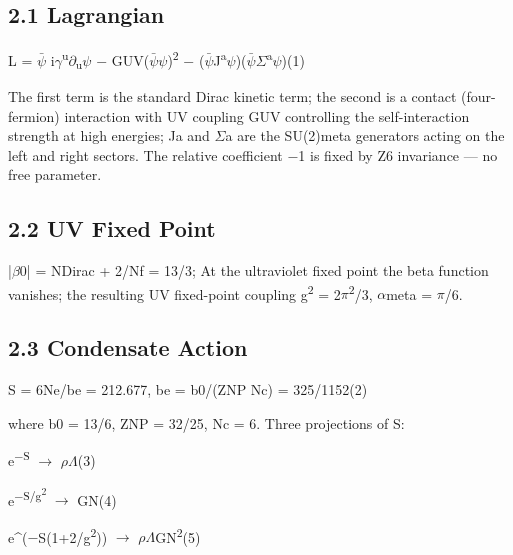 \documentclass[11pt,letterpaper]{article}
\begin{document}
\subsection*{2.1  Lagrangian}

\begingroup\centering L = $\bar{\psi}$ i$\gamma$\textsuperscript{u}$\partial$\textsubscript{u}$\psi$ $-$ GUV($\bar{\psi}$$\psi$)\textsuperscript{2} $-$ ($\bar{\psi}$J\textsuperscript{a}$\psi$)($\bar{\psi}$$\Sigma$\textsuperscript{a}$\psi$)\hspace{2em}(1)\par\endgroup

\noindent The first term is the standard Dirac kinetic term; the second is a contact (four-fermion) interaction with UV coupling GUV controlling the self-interaction strength at high energies; Ja and $\Sigma$a are the SU(2)meta generators acting on the left and right sectors. The relative coefficient $-$1 is fixed by Z6 invariance --- no free parameter.

\subsection*{2.2  UV Fixed Point}

\noindent |$\beta$0| = NDirac + 2/Nf = 13/3; At the ultraviolet fixed point the beta function vanishes; the resulting UV fixed-point coupling g\textsuperscript{2} = 2$\pi$\textsuperscript{2}/3, $\alpha$meta = $\pi$/6.

\subsection*{2.3  Condensate Action}

\begingroup\centering S = 6Ne/be = 212.677,   be = b0/(ZNP Nc) = 325/1152\hspace{2em}(2)\par\endgroup

\noindent where b0 = 13/6, ZNP = 32/25, Nc = 6. Three projections of S:

\begingroup\centering e\textsuperscript{$-$S} $\to$ $\rho$$\Lambda$\hspace{2em}(3)\par\endgroup

\begingroup\centering e\textsuperscript{$-$S/g\textsuperscript{2}} $\to$ GN\hspace{2em}(4)\par\endgroup

\begingroup\centering e\textasciicircum{}($-$S(1+2/g\textsuperscript{2})) $\to$ $\rho$$\Lambda$GN\textsuperscript{2}\hspace{2em}(5)\par\endgroup
\end{document}
